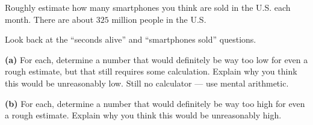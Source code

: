 \documentclass[12pt]{ximera}
\begin{document}
\begin{problem}
Roughly estimate how many smartphones you think are sold in the U.S. each month.
There are about $325$ million people in the U.S.

\begin{freeResponse}
\end{freeResponse}
\end{problem}

\begin{problem}
Look back at the ``seconds alive'' and ``smartphones sold'' questions.

\begin{prompt}
\textbf{(a)} For each, determine a number that would definitely be way too low for
even a rough estimate, but that still requires some calculation. Explain why you
think this would be unreasonably low. Still no calculator --- use mental arithmetic.
\begin{freeResponse}
\end{freeResponse}
\end{prompt}

\begin{prompt}
\textbf{(b)} For each, determine a number that would definitely be way too high for
even a rough estimate. Explain why you think this would be unreasonably high.
\begin{freeResponse}
\end{freeResponse}
\end{prompt}
\end{problem}
\end{document}
